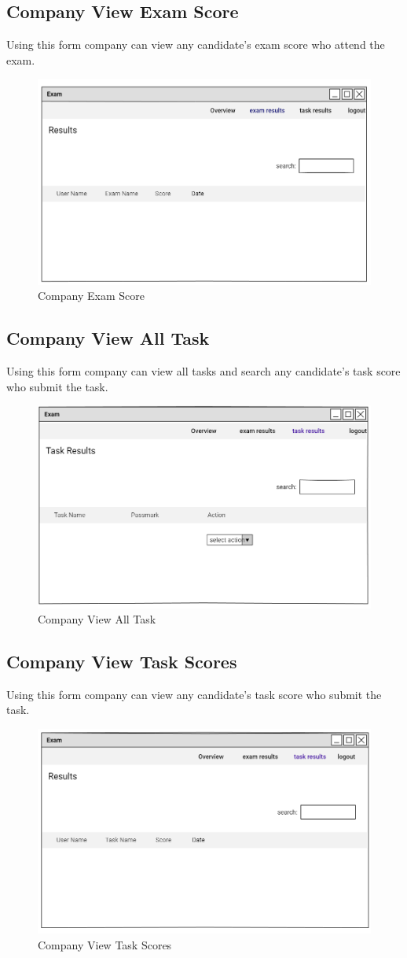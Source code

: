 \documentclass[a4paper,12pt]{report}
\begin{document}
\subsection {Company View Exam  Score}
Using this form company can view any candidate's exam score who attend the exam.
\begin{figure}[bph]
	\centering
	\includegraphics[width=.6\linewidth]{img/company/cmpnyviewsinlexmrslt}
	\caption{Company  Exam  Score}
\end{figure}
\pagebreak
\subsection {Company View All Task }
Using this form company can view all tasks and search any candidate's task score who submit the task.
\begin{figure}[bph]
	\centering
	\includegraphics[width=.7\linewidth]{img/company/ct1}
	\caption{Company View All Task }
\end{figure}
\pagebreak
\subsection {Company View Task Scores }
Using this form company can view any candidate's task score who submit the task.
\begin{figure}[bph]
	\centering
	\includegraphics[width=.7\linewidth]{img/company/ct2}
	\caption{Company View Task Scores }
\end{figure}
\pagebreak
\end{document}
